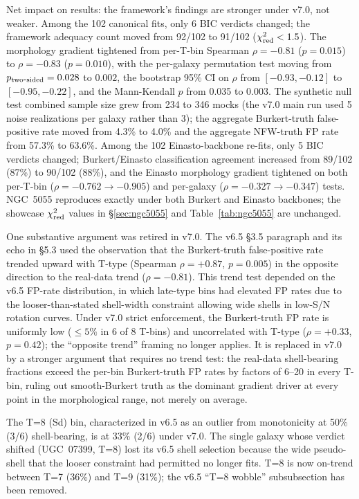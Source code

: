 Net impact on results: the framework's findings are stronger under v7.0, not weaker. Among the 102 canonical fits, only 6 BIC verdicts changed; the framework adequacy count moved from 92/102 to 91/102 ($\chi^2_{\rm red} < 1.5$). The morphology gradient tightened from per-T-bin Spearman $\rho = -0.81$ ($p = 0.015$) to $\rho = -0.83$ ($p = 0.010$), with the per-galaxy permutation test moving from $p_{\rm two\mbox{-}sided} = 0.028$ to $0.002$, the bootstrap 95\% CI on $\rho$ from $[-0.93, -0.12]$ to $[-0.95, -0.22]$, and the Mann-Kendall $p$ from 0.035 to 0.003. The synthetic null test combined sample size grew from 234 to 346 mocks (the v7.0 main run used 5 noise realizations per galaxy rather than 3); the aggregate Burkert-truth false-positive rate moved from 4.3\% to 4.0\% and the aggregate NFW-truth FP rate from 57.3\% to 63.6\%. Among the 102 Einasto-backbone re-fits, only 5 BIC verdicts changed; Burkert/Einasto classification agreement increased from 89/102 (87\%) to 90/102 (88\%), and the Einasto morphology gradient tightened on both per-T-bin ($\rho = -0.762 \to -0.905$) and per-galaxy ($\rho = -0.327 \to -0.347$) tests. NGC~5055 reproduces exactly under both Burkert and Einasto backbones; the showcase $\chi^2_{\rm red}$ values in \S\ref{sec:ngc5055} and Table~\ref{tab:ngc5055} are unchanged.

One substantive argument was retired in v7.0. The v6.5 §3.5 paragraph and its echo in §5.3 used the observation that the Burkert-truth false-positive rate trended upward with T-type (Spearman $\rho = +0.87$, $p = 0.005$) in the opposite direction to the real-data trend ($\rho = -0.81$). This trend test depended on the v6.5 FP-rate distribution, in which late-type bins had elevated FP rates due to the looser-than-stated shell-width constraint allowing wide shells in low-S/N rotation curves. Under v7.0 strict enforcement, the Burkert-truth FP rate is uniformly low ($\leq 5\%$ in 6 of 8 T-bins) and uncorrelated with T-type ($\rho = +0.33$, $p = 0.42$); the ``opposite trend'' framing no longer applies. It is replaced in v7.0 by a stronger argument that requires no trend test: the real-data shell-bearing fractions exceed the per-bin Burkert-truth FP rates by factors of 6--20 in every T-bin, ruling out smooth-Burkert truth as the dominant gradient driver at every point in the morphological range, not merely on average.

The T=8 (Sd) bin, characterized in v6.5 as an outlier from monotonicity at 50\% (3/6) shell-bearing, is at 33\% (2/6) under v7.0. The single galaxy whose verdict shifted (UGC~07399, T=8) lost its v6.5 shell selection because the wide pseudo-shell that the looser constraint had permitted no longer fits. T=8 is now on-trend between T=7 (36\%) and T=9 (31\%); the v6.5 ``T=8 wobble'' subsubsection has been removed.

